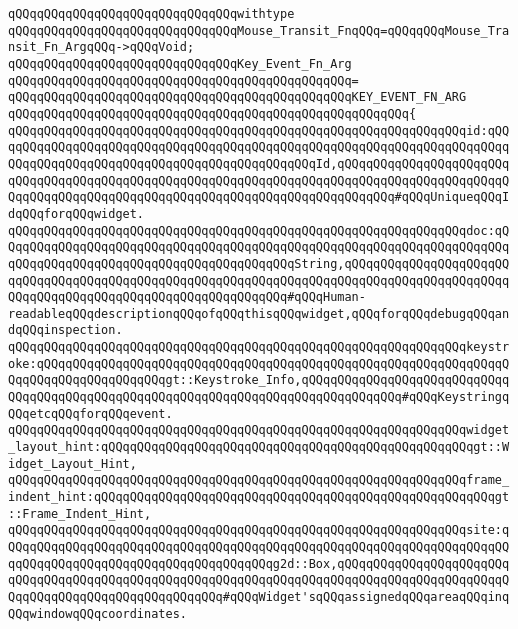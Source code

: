 \verb|qQQqqQQqqQQqqQQqqQQqqQQqqQQqqQQqwithtype|\newline
\verb|qQQqqQQqqQQqqQQqqQQqqQQqqQQqqQQqMouse_Transit_FnqQQq=qQQqqQQqMouse_Transit_Fn_ArgqQQq->qQQqVoid;|\newline
\newline
\newline
\newline
\verb|qQQqqQQqqQQqqQQqqQQqqQQqqQQqqQQqKey_Event_Fn_Arg|\newline
\verb|qQQqqQQqqQQqqQQqqQQqqQQqqQQqqQQqqQQqqQQqqQQqqQQq=|\newline
\verb|qQQqqQQqqQQqqQQqqQQqqQQqqQQqqQQqqQQqqQQqqQQqqQQqKEY_EVENT_FN_ARG|\newline
\verb|qQQqqQQqqQQqqQQqqQQqqQQqqQQqqQQqqQQqqQQqqQQqqQQqqQQqqQQq{|\newline
\verb|qQQqqQQqqQQqqQQqqQQqqQQqqQQqqQQqqQQqqQQqqQQqqQQqqQQqqQQqqQQqqQQqid:qQQqqQQqqQQqqQQqqQQqqQQqqQQqqQQqqQQqqQQqqQQqqQQqqQQqqQQqqQQqqQQqqQQqqQQqqQQqqQQqqQQqqQQqqQQqqQQqqQQqqQQqqQQqqQQqqQQqId,qQQqqQQqqQQqqQQqqQQqqQQqqQQqqQQqqQQqqQQqqQQqqQQqqQQqqQQqqQQqqQQqqQQqqQQqqQQqqQQqqQQqqQQqqQQqqQQqqQQqqQQqqQQqqQQqqQQqqQQqqQQqqQQqqQQqqQQqqQQqqQQqqQQq#qQQqUniqueqQQqIdqQQqforqQQqwidget.|\newline
\verb|qQQqqQQqqQQqqQQqqQQqqQQqqQQqqQQqqQQqqQQqqQQqqQQqqQQqqQQqqQQqqQQqdoc:qQQqqQQqqQQqqQQqqQQqqQQqqQQqqQQqqQQqqQQqqQQqqQQqqQQqqQQqqQQqqQQqqQQqqQQqqQQqqQQqqQQqqQQqqQQqqQQqqQQqqQQqqQQqqQQqString,qQQqqQQqqQQqqQQqqQQqqQQqqQQqqQQqqQQqqQQqqQQqqQQqqQQqqQQqqQQqqQQqqQQqqQQqqQQqqQQqqQQqqQQqqQQqqQQqqQQqqQQqqQQqqQQqqQQqqQQqqQQqqQQqqQQq#qQQqHuman-readableqQQqdescriptionqQQqofqQQqthisqQQqwidget,qQQqforqQQqdebugqQQqandqQQqinspection.|\newline
\verb|qQQqqQQqqQQqqQQqqQQqqQQqqQQqqQQqqQQqqQQqqQQqqQQqqQQqqQQqqQQqqQQqkeystroke:qQQqqQQqqQQqqQQqqQQqqQQqqQQqqQQqqQQqqQQqqQQqqQQqqQQqqQQqqQQqqQQqqQQqqQQqqQQqqQQqqQQqqQQqgt::Keystroke_Info,qQQqqQQqqQQqqQQqqQQqqQQqqQQqqQQqqQQqqQQqqQQqqQQqqQQqqQQqqQQqqQQqqQQqqQQqqQQqqQQqqQQq#qQQqKeystringqQQqetcqQQqforqQQqevent.|\newline
\verb|qQQqqQQqqQQqqQQqqQQqqQQqqQQqqQQqqQQqqQQqqQQqqQQqqQQqqQQqqQQqqQQqwidget_layout_hint:qQQqqQQqqQQqqQQqqQQqqQQqqQQqqQQqqQQqqQQqqQQqqQQqqQQqgt::Widget_Layout_Hint,|\newline
\verb|qQQqqQQqqQQqqQQqqQQqqQQqqQQqqQQqqQQqqQQqqQQqqQQqqQQqqQQqqQQqqQQqframe_indent_hint:qQQqqQQqqQQqqQQqqQQqqQQqqQQqqQQqqQQqqQQqqQQqqQQqqQQqqQQqgt::Frame_Indent_Hint,|\newline
\verb|qQQqqQQqqQQqqQQqqQQqqQQqqQQqqQQqqQQqqQQqqQQqqQQqqQQqqQQqqQQqqQQqsite:qQQqqQQqqQQqqQQqqQQqqQQqqQQqqQQqqQQqqQQqqQQqqQQqqQQqqQQqqQQqqQQqqQQqqQQqqQQqqQQqqQQqqQQqqQQqqQQqqQQqqQQqqQQqg2d::Box,qQQqqQQqqQQqqQQqqQQqqQQqqQQqqQQqqQQqqQQqqQQqqQQqqQQqqQQqqQQqqQQqqQQqqQQqqQQqqQQqqQQqqQQqqQQqqQQqqQQqqQQqqQQqqQQqqQQqqQQqqQQq#qQQqWidget'sqQQqassignedqQQqareaqQQqinqQQqwindowqQQqcoordinates.|\newline
